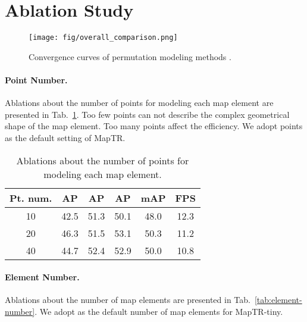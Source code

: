 \documentclass{article} \usepackage{iclr2023_conference,times}
\begin{document}
\section{Ablation Study}
\label{sec:more_ablation}

\begin{figure}[h!]
    \begin{center}
    \texttt{[image: fig/overall\_comparison.png]}
    \end{center}
    \vspace*{-0.3cm}
    \caption{Convergence curves of permutation modeling methods .}
    \label{fig:stablization}
\end{figure}


\paragraph{Point Number.}
Ablations about the number of points for modeling each map element are presented in Tab.~\ref{tab:point-number}. Too few points can not describe the complex geometrical shape of the map element. Too many points affect the efficiency. We adopt  points as the default setting of MapTR.

\begin{table}[ht]
\begin{center}
\begin{tabular}{c|ccc|cc}
\hline
\rowcolor{Gray}
Pt. num. & AP & AP & AP &mAP & FPS  \\
\toprule
10        &42.5&51.3&50.1& 48.0  & 12.3 \\
20  &\cellcolor{blue!10}46.3&\cellcolor{blue!10}51.5&\cellcolor{blue!10}53.1&\cellcolor{blue!10}50.3&\cellcolor{blue!10}11.2\\
40 &44.7&52.4&52.9  &50.0 & 10.8\\
\bottomrule
\end{tabular}
\end{center}
\vspace*{-0.45cm}
\caption{Ablations about the number of points for modeling each map element.}
\label{tab:point-number}
\vspace*{-0.35cm}
\end{table}


\paragraph{Element Number.}
Ablations about the number of map elements are presented in Tab.~\ref{tab:element-number}. We adopt  as the default number of map elements for MapTR-tiny.
\end{document}
